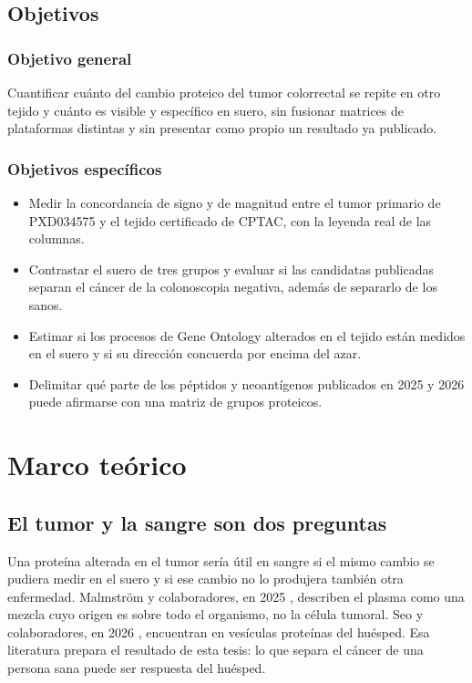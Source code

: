 \documentclass[12pt,oneside]{report}
\begin{document}
\section{Objetivos}
\subsection{Objetivo general}
Cuantificar cuánto del cambio proteico del tumor colorrectal se repite en otro tejido y cuánto es visible y específico en suero, sin fusionar matrices de plataformas distintas y sin presentar como propio un resultado ya publicado.

\subsection{Objetivos específicos}
\begin{itemize}
\item Medir la concordancia de signo y de magnitud entre el tumor primario de PXD034575 y el tejido certificado de CPTAC, con la leyenda real de las columnas.
\item Contrastar el suero de tres grupos y evaluar si las candidatas publicadas separan el cáncer de la colonoscopia negativa, además de separarlo de los sanos.
\item Estimar si los procesos de Gene Ontology alterados en el tejido están medidos en el suero y si su dirección concuerda por encima del azar.
\item Delimitar qué parte de los péptidos y neoantígenos publicados en 2025 y 2026 puede afirmarse con una matriz de grupos proteicos.
\end{itemize}
\chapter{Marco teórico}
\section{El tumor y la sangre son dos preguntas}
Una proteína alterada en el tumor sería útil en sangre si el mismo cambio se pudiera medir en el suero y si ese cambio no lo produjera también otra enfermedad. Malmström y colaboradores, en 2025 \cite{malmstrom2025}, describen el plasma como una mezcla cuyo origen es sobre todo el organismo, no la célula tumoral. Seo y colaboradores, en 2026 \cite{seo2026}, encuentran en vesículas proteínas del huésped. Esa literatura prepara el resultado de esta tesis: lo que separa el cáncer de una persona sana puede ser respuesta del huésped.
\end{document}
